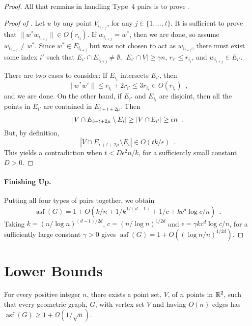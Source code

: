\documentclass{patmorin}
\DeclareMathOperator{\asf}{asf}
\begin{document}
\begin{proof}
  All that remains in handling Type~4 pairs is to prove .

  \begin{proof}[Proof of ]
  Let $u$ by any point $V_{i_{i+j}}$, for any $j\in\{1,\ldots,t\}$.
  It is sufficient to prove that $\|w^*w_{i_{i+j}}\|\in O(r_{i_i})$.
  If $w_{i_{i+j}}=w^*$, then we are done, so assume $w_{i_{i+j}}\neq
  w^*$.  Since $w^*\in E_{i_{i+j}}$ but was not chosen to act as
  $w_{i_{i+j}}$, there must exist some index $i'$ such that $E_{i'}\cap
  E_{i_{i+j}}\neq\emptyset$, $|E_{i'}\cap V|\ge\gamma n$, $r_{i'}\le
  r_{i_i}$, and $w_{i_{i+j}}\in E_{i'}$.

  There are two cases to consider:
  If $E_{i_i}$ intersects $E_{i'}$, then 
  \[
     \|w^*w'\|\le r_{i_i} + 2r_{i'} \le 3r_{i_i} \in O(r_{i_i}) \enspace ,
  \]
  and we are done.  On the other hand, if $E_{i'}$ and $E_{i_i}$
  are disjoint, then all the points in $E_{i'}$ are contained in
  $E_{i+t+2\mu}$.  Then
  \[
      |V\cap E_{i+t+2\mu}\setminus E_i| \ge |V\cap\mathrm{E}_{i'}| \ge \epsilon n \enspace .
  \]
  But, by definition, 
  \[
      |V\cap E_{i+t+2\mu}\setminus E_i| \in O(tk/\epsilon) \enspace .
  \]
  This yields a contradiction when $t<D \epsilon^2 n/k$, for a
  sufficiently small constant $D>0$.
  \end{proof}


  \paragraph{Finishing Up.}
  Putting all four types of pairs together, we obtain
  \[
     \asf(G) = 1 + O(k/n + 1/k^{1/(d-1)} + 1/c + kc^d\log c/n) \enspace .
  \]
  Taking $k=(n/\log n)^{(d-1)/2d}$, $c=(n/\log n)^{1/2d}$ and $\epsilon
  = \gamma kc^d\log c/n$, for a sufficiently large constant $\gamma >0$
  gives $\asf(G)=1+O((\log n/n)^{1/2d})$.
\end{proof}



\section{Lower Bounds}

\begin{thm}
  For every positive integer $n$, there exists a point set, $V$, of $n$
  points in $\mathbb{R}^2$, such that every geometric graph, $G$, with vertex
  set $V$ and having $O(n)$ edges has $\asf(G)\ge 1 + \Omega(1/\sqrt{n})$.
\end{thm}
\end{document}
